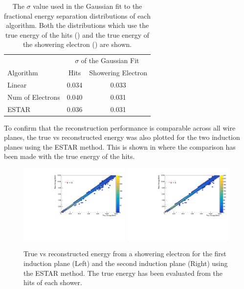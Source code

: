 \begin{table}[h!]
\begin{tabular}{lcc}
 & \multicolumn{2}{c}{$\sigma$ of the Gaussian Fit} \\
Algorithm & Hits & Showering Electron \\ \hline
Linear & 0.034  & 0.033 \\
Num of Electrons & 0.040 & 0.031 \\
ESTAR & 0.036 & 0.031
\end{tabular}
\caption[The $\sigma$ value used in the Gaussian fit to the fractional energy separation distributions of each algorithm.]{The $\sigma$ value used in the Gaussian fit to the fractional energy separation distributions of each algorithm. Both the distributions which use the true energy of the hits () and the true energy of the showering electron () are shown.}
\label{table:gaus_fit_sigma_values}
\end{table}

\newpage
To confirm that the reconstruction performance is comparable across all wire planes, the true vs reconstructed energy was also plotted for the two induction planes using the ESTAR method. This is shown in  where the comparison has been made with the true energy of the hits.

\begin{figure}[h!]
    \centering
    \includegraphics[width = 0.49\textwidth]{figures-chap4/true_vs_reco_plane0_ESTAR.pdf}
    \includegraphics[width = 0.49\textwidth]{figures-chap4/true_vs_reco_plane1_ESTAR.pdf}
    \caption[True vs reconstructed energy from a showering electron for the two induction planes using the ESTAR method. The true energy has been evaluated from the hits of each shower.]{True vs reconstructed energy from a showering electron for the first induction plane (Left) and the second induction plane (Right) using the ESTAR method. The true energy has been evaluated from the hits of each shower.}
    \label{fig:true_vs_reco_for_induction_planes}
\end{figure}

